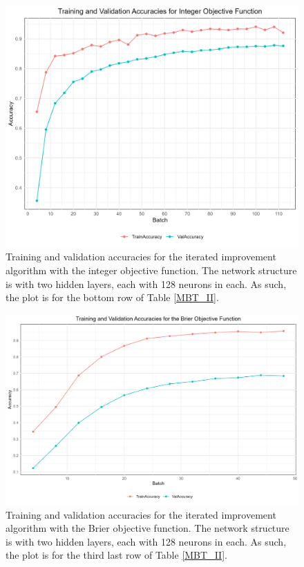\begin{figure}[H]
    \centering
    \includegraphics[width=1\linewidth]{Figures/MBT_II_INTEGER.png}
    \caption{Training and validation accuracies for the iterated improvement algorithm with the integer objective function. The network structure is with two hidden layers, each with 128 neurons in each. As such, the plot is for the bottom row of Table \ref{MBT_II}.}
    \label{MBT_II_INTEGER}
\end{figure}

\begin{figure}[H]
    \centering
    \includegraphics[width=1\linewidth]{Figures/MBT_II_BRIER.png}
    \caption{Training and validation accuracies for the iterated improvement algorithm with the Brier objective function. The network structure is with two hidden layers, each with 128 neurons in each. As such, the plot is for the third last row of Table \ref{MBT_II}.}
    \label{MBT_II_BRIER}
\end{figure}

